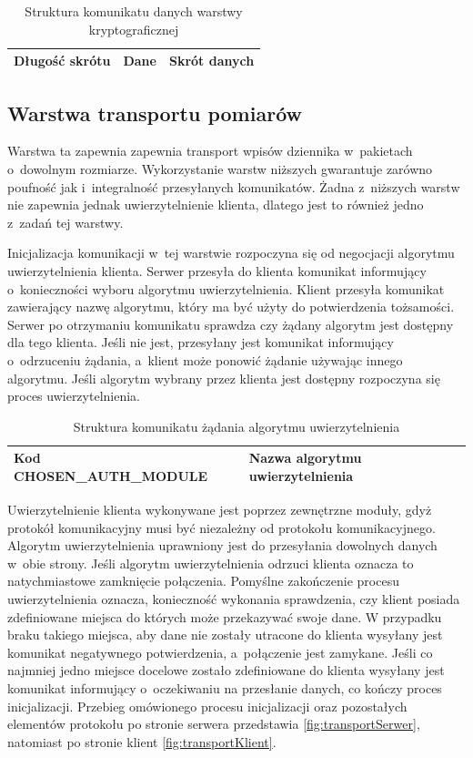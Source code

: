 \begin{table}[H]
\centering
\caption{Struktura komunikatu danych warstwy kryptograficznej }

\begin{tabular}{|p{3cm}|p{6cm}|p{3cm}|}
\hline
Długość skrótu & Dane & Skrót danych\\
\hline
\end{tabular}
\end{table}

\subsection[Warstwa transportu pomiarów][Warstwa transportu pomiarów]{Warstwa transportu pomiarów}

Warstwa ta zapewnia zapewnia transport wpisów dziennika w~pakietach
o~dowolnym rozmiarze. Wykorzystanie warstw niższych gwarantuje zarówno
poufność jak i~integralność przesyłanych komunikatów. Żadna z~niższych
warstw nie zapewnia jednak uwierzytelnienie klienta, dlatego jest to
również jedno z~zadań tej warstwy.

Inicjalizacja komunikacji w~tej warstwie rozpoczyna się od negocjacji
algorytmu uwierzytelnienia klienta. Serwer przesyła do klienta
komunikat informujący o~konieczności wyboru algorytmu
uwierzytelnienia. Klient przesyła komunikat zawierający nazwę
algorytmu, który ma być użyty do potwierdzenia tożsamości. Serwer po
otrzymaniu komunikatu sprawdza czy żądany algorytm jest dostępny dla
tego klienta. Jeśli nie jest, przesyłany jest komunikat informujący
o~odrzuceniu żądania, a~klient może ponowić żądanie używając innego
algorytmu. Jeśli algorytm wybrany przez klienta jest dostępny
rozpoczyna się proces uwierzytelnienia.

\begin{table}[H]
\centering
\caption{Struktura komunikatu żądania algorytmu uwierzytelnienia }
\begin{tabular}{|p{5cm}|p{6cm}|}
\hline
\raggedright{Kod CHOSEN\_AUTH\_MODULE} & Nazwa algorytmu uwierzytelnienia\\
\hline
\end{tabular}
\end{table}

Uwierzytelnienie klienta wykonywane jest poprzez zewnętrzne moduły,
gdyż protokół komunikacyjny musi być niezależny od protokołu
komunikacyjnego. Algorytm uwierzytelnienia uprawniony jest do
przesyłania dowolnych danych w~obie strony. Jeśli algorytm
uwierzytelnienia odrzuci klienta oznacza to natychmiastowe zamknięcie
połączenia. Pomyślne zakończenie procesu uwierzytelnienia oznacza,
konieczność wykonania sprawdzenia, czy klient posiada zdefiniowane
miejsca do których może przekazywać swoje dane. W przypadku braku
takiego miejsca, aby dane nie zostały utracone do klienta wysyłany
jest komunikat negatywnego potwierdzenia, a~połączenie jest
zamykane. Jeśli co najmniej jedno miejsce docelowe zostało
zdefiniowane do klienta wysyłany jest komunikat informujący
o~oczekiwaniu na przesłanie danych, co kończy proces
inicjalizacji. Przebieg omówionego procesu inicjalizacji oraz
pozostałych elementów protokołu po stronie serwera przedstawia
\ref{fig:transportSerwer}, natomiast po stronie klient
\ref{fig:transportKlient}.


